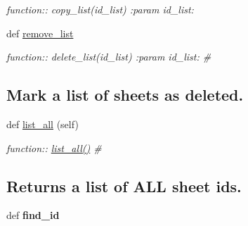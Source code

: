 \begin{DoxyCompactItemize}
\begin{DoxyCompactList}\small\item\em function\+:\+: copy\+\_\+list(id\+\_\+list) \+:param id\+\_\+list\+: \end{DoxyCompactList}\item 
def \hyperlink{classplume-creator_1_1src_1_1plume_1_1data_1_1property_1_1db__property__list_1_1_db_property_list_a0cb2c9b99bfe227d96933ccc33945151}{remove\+\_\+list}
\begin{DoxyCompactList}\small\item\em function\+:\+: delete\+\_\+list(id\+\_\+list) \+:param id\+\_\+list\+: \# \subsection*{Mark a list of sheets as deleted.}\end{DoxyCompactList}\item 
def \hyperlink{classplume-creator_1_1src_1_1plume_1_1data_1_1property_1_1db__property__list_1_1_db_property_list_a9364f3370af734a06d9ee10aa61d53cd}{list\+\_\+all} (self)
\begin{DoxyCompactList}\small\item\em function\+:\+: \hyperlink{classplume-creator_1_1src_1_1plume_1_1data_1_1property_1_1db__property__list_1_1_db_property_list_a9364f3370af734a06d9ee10aa61d53cd}{list\+\_\+all()} \# \subsection*{Returns a list of A\+LL sheet ids.}\end{DoxyCompactList}\item 
def {\bfseries find\+\_\+id}\hypertarget{classplume-creator_1_1src_1_1plume_1_1data_1_1property_1_1db__property__list_1_1_db_property_list_aa150df9538215d3a946e0cc76daba5f2}{}\label{classplume-creator_1_1src_1_1plume_1_1data_1_1property_1_1db__property__list_1_1_db_property_list_aa150df9538215d3a946e0cc76daba5f2}

\end{DoxyCompactItemize}
